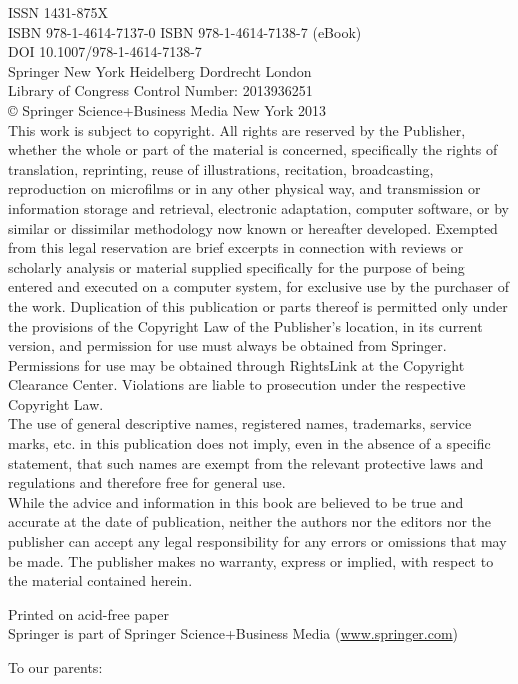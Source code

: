 \documentclass[10pt]{article}
\begin{document}
ISSN 1431-875X\\
ISBN 978-1-4614-7137-0 ISBN 978-1-4614-7138-7 (eBook)\\
DOI 10.1007/978-1-4614-7138-7\\
Springer New York Heidelberg Dordrecht London\\
Library of Congress Control Number: 2013936251\\
© Springer Science+Business Media New York 2013\\
This work is subject to copyright. All rights are reserved by the Publisher, whether the whole or part of the material is concerned, specifically the rights of translation, reprinting, reuse of illustrations, recitation, broadcasting, reproduction on microfilms or in any other physical way, and transmission or information storage and retrieval, electronic adaptation, computer software, or by similar or dissimilar methodology now known or hereafter developed. Exempted from this legal reservation are brief excerpts in connection with reviews or scholarly analysis or material supplied specifically for the purpose of being entered and executed on a computer system, for exclusive use by the purchaser of the work. Duplication of this publication or parts thereof is permitted only under the provisions of the Copyright Law of the Publisher's location, in its current version, and permission for use must always be obtained from Springer. Permissions for use may be obtained through RightsLink at the Copyright Clearance Center. Violations are liable to prosecution under the respective Copyright Law.\\
The use of general descriptive names, registered names, trademarks, service marks, etc. in this publication does not imply, even in the absence of a specific statement, that such names are exempt from the relevant protective laws and regulations and therefore free for general use.\\
While the advice and information in this book are believed to be true and accurate at the date of publication, neither the authors nor the editors nor the publisher can accept any legal responsibility for any errors or omissions that may be made. The publisher makes no warranty, express or implied, with respect to the material contained herein.

Printed on acid-free paper\\
Springer is part of Springer Science+Business Media (\href{http://www.springer.com}{www.springer.com})

To our parents:
\end{document}
